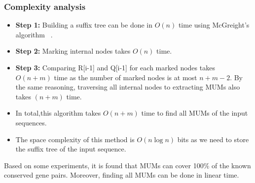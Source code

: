\documentclass[3p,times]{elsarticle}
\begin{document}
\subsubsection{Complexity analysis} 
\begin{itemize}
  \item \textbf{Step 1:} Building a suffix tree can be done in $O(n)$ time using McGreight's algorithm ~\cite{McCreight:1976:SST:321941.321946}.
  \item \textbf{Step 2:} Marking internal nodes takes $O(n)$ time. 
  \item \textbf{Step 3:} Comparing R[i-1] and Q[i-1] for each marked nodes takes $O(n+m)$ time as the number of marked nodes is at most $n+m-2$. By the same reasoning, traversing all internal nodes to extracting MUMs also takes $(n+m)$ time.
  \item In total,this algorithm takes $O(n+m)$ time to find all MUMs of the input sequences.
  \item The space complexity of this method is $O\left(n\log n\right)$ bits as we need to store the suffix tree of the input sequence.
\end{itemize}
Based on some experiments, it is found that MUMs can cover 100\% of the known conserved gene pairs. Moreover, finding all MUMs can be done in linear time.
\end{document}
